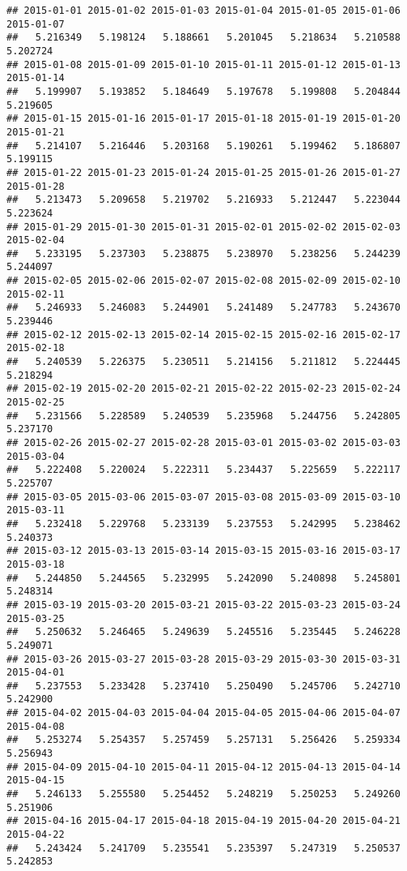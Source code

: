 \documentclass[
]{article}
\begin{document}
\begin{verbatim}
## 2015-01-01 2015-01-02 2015-01-03 2015-01-04 2015-01-05 2015-01-06 2015-01-07 
##   5.216349   5.198124   5.188661   5.201045   5.218634   5.210588   5.202724 
## 2015-01-08 2015-01-09 2015-01-10 2015-01-11 2015-01-12 2015-01-13 2015-01-14 
##   5.199907   5.193852   5.184649   5.197678   5.199808   5.204844   5.219605 
## 2015-01-15 2015-01-16 2015-01-17 2015-01-18 2015-01-19 2015-01-20 2015-01-21 
##   5.214107   5.216446   5.203168   5.190261   5.199462   5.186807   5.199115 
## 2015-01-22 2015-01-23 2015-01-24 2015-01-25 2015-01-26 2015-01-27 2015-01-28 
##   5.213473   5.209658   5.219702   5.216933   5.212447   5.223044   5.223624 
## 2015-01-29 2015-01-30 2015-01-31 2015-02-01 2015-02-02 2015-02-03 2015-02-04 
##   5.233195   5.237303   5.238875   5.238970   5.238256   5.244239   5.244097 
## 2015-02-05 2015-02-06 2015-02-07 2015-02-08 2015-02-09 2015-02-10 2015-02-11 
##   5.246933   5.246083   5.244901   5.241489   5.247783   5.243670   5.239446 
## 2015-02-12 2015-02-13 2015-02-14 2015-02-15 2015-02-16 2015-02-17 2015-02-18 
##   5.240539   5.226375   5.230511   5.214156   5.211812   5.224445   5.218294 
## 2015-02-19 2015-02-20 2015-02-21 2015-02-22 2015-02-23 2015-02-24 2015-02-25 
##   5.231566   5.228589   5.240539   5.235968   5.244756   5.242805   5.237170 
## 2015-02-26 2015-02-27 2015-02-28 2015-03-01 2015-03-02 2015-03-03 2015-03-04 
##   5.222408   5.220024   5.222311   5.234437   5.225659   5.222117   5.225707 
## 2015-03-05 2015-03-06 2015-03-07 2015-03-08 2015-03-09 2015-03-10 2015-03-11 
##   5.232418   5.229768   5.233139   5.237553   5.242995   5.238462   5.240373 
## 2015-03-12 2015-03-13 2015-03-14 2015-03-15 2015-03-16 2015-03-17 2015-03-18 
##   5.244850   5.244565   5.232995   5.242090   5.240898   5.245801   5.248314 
## 2015-03-19 2015-03-20 2015-03-21 2015-03-22 2015-03-23 2015-03-24 2015-03-25 
##   5.250632   5.246465   5.249639   5.245516   5.235445   5.246228   5.249071 
## 2015-03-26 2015-03-27 2015-03-28 2015-03-29 2015-03-30 2015-03-31 2015-04-01 
##   5.237553   5.233428   5.237410   5.250490   5.245706   5.242710   5.242900 
## 2015-04-02 2015-04-03 2015-04-04 2015-04-05 2015-04-06 2015-04-07 2015-04-08 
##   5.253274   5.254357   5.257459   5.257131   5.256426   5.259334   5.256943 
## 2015-04-09 2015-04-10 2015-04-11 2015-04-12 2015-04-13 2015-04-14 2015-04-15 
##   5.246133   5.255580   5.254452   5.248219   5.250253   5.249260   5.251906 
## 2015-04-16 2015-04-17 2015-04-18 2015-04-19 2015-04-20 2015-04-21 2015-04-22 
##   5.243424   5.241709   5.235541   5.235397   5.247319   5.250537   5.242853 

\end{verbatim}
\end{document}
